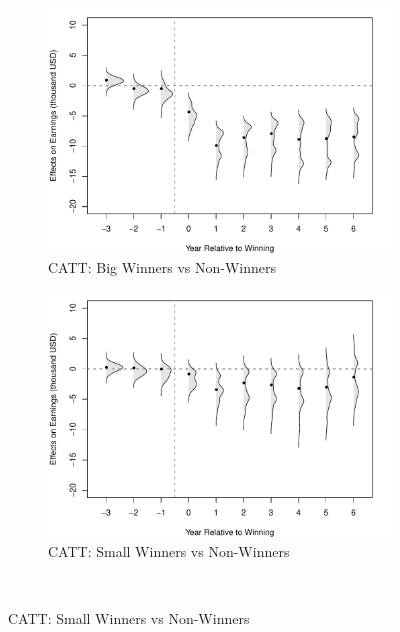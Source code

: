 \documentclass[letterpaper,12pt,leqno]{article}
\begin{document}
\begin{figure}[!ht]
\begin{minipage}[c]{1\textwidth}
\begin{subfigure}{0.45\linewidth}
        \end{subfigure}\\
        \hspace{-2em}\begin{subfigure}{0.45\linewidth}
        \includegraphics[width=\linewidth]{irs1_catt.pdf}
            \caption{CATT: Big Winners vs Non-Winners}
        \end{subfigure}\hspace{1em}
        \begin{subfigure}{0.45\linewidth}
            \includegraphics[width=\linewidth]{irs2_catt.pdf}
            \caption{CATT: Small Winners vs Non-Winners}
        \end{subfigure}
    \end{minipage}\\

\end{figure}
\end{document}
